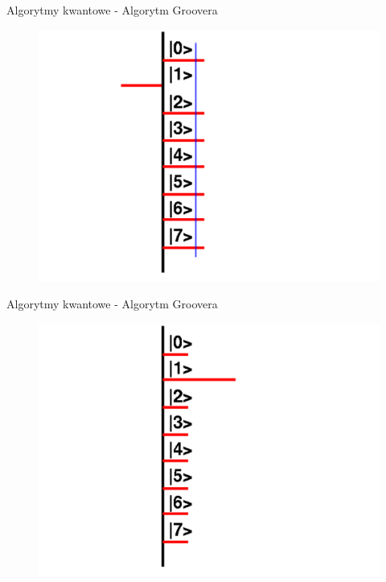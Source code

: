 \documentclass{beamer}
\begin{document}
	\begin{frame}{Algorytmy kwantowe - Algorytm Groovera}
		\vspace{0.5em}
		\begin{center}
			\begin{figure}
				\includegraphics[scale=0.35]{media/visualization3.png}
			\end{figure}
		\end{center}
		\vspace{0.5em}
	\end{frame}		
	
		\begin{frame}{Algorytmy kwantowe - Algorytm Groovera}
		\vspace{0.5em}
		\begin{center}
			\begin{figure}
				\includegraphics[scale=0.35]{media/visualization4.png}
			\end{figure}
		\end{center}
		\vspace{0.5em}
	\end{frame}
	
\end{document}

